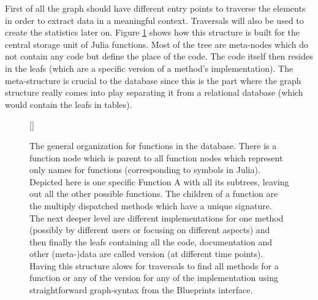 \documentclass[twoside, 11pt]{scrartcl}
\begin{document}
First of all the graph should have different entry points to traverse the elements in order  to extract data in a meaningful context. Traversals will also be used to create the statistics later on. Figure \ref{fig:dbStructure1} shows how this structure is built for the central storage unit of Julia functions. Most of the tree are meta-nodes which do not contain any code but define the place of the code. The code itself then resides in the leafs (which are a specific version of a method's implementation).  The meta-structure is crucial to the database since this is the part where the graph structure really comes into play separating it from a relational database (which would contain the leafs in tables).

\begin{figure}[h!]		
	[\FBwidth]
	{\caption{The general organization for functions in the database. There is a function node which is parent to all function nodes which represent only names for functions (corresponding to symbols in Julia). Depicted here is one specific Function A with all its subtrees, leaving out all the other possible functions. The children of a function are the multiply dispatched methods which have a unique signature. The next deeper level are different implementations for one method (possibly by different users or focusing on different aspects) and then finally the leafs containing all the code, documentation and other (meta-)data are called version (at different time points). Having this structure alows for traversals to find all methods for a function or any of the version for any of the implementation using straightforward graph-syntax from the Blueprints interface.}\label{fig:dbStructure1}}

\end{figure}
\end{document}
